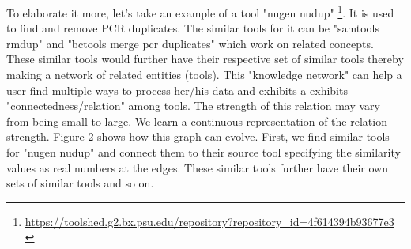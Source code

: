 To elaborate it more, let's take an example of a tool "nugen nudup" \footnote{\url{ https://toolshed.g2.bx.psu.edu/repository?repository_id=4f614394b93677e3 }}. It is used to find and remove PCR duplicates. The similar tools for it can be "samtools rmdup" and "bctools merge pcr duplicates" which work on related concepts. These similar tools would further have their respective set of similar tools thereby making a network of related entities (tools). This "knowledge network" can help a user find multiple ways to process her/his data and exhibits a exhibits "connectedness/relation" among tools. The strength of this relation may vary from being small to large. We learn a continuous representation of the relation strength. Figure 2 shows how this graph can evolve. First, we find similar tools for "nugen nudup" and connect them to their source tool specifying the similarity values as real numbers at the edges. These similar tools further have their own sets of similar tools and so on.

